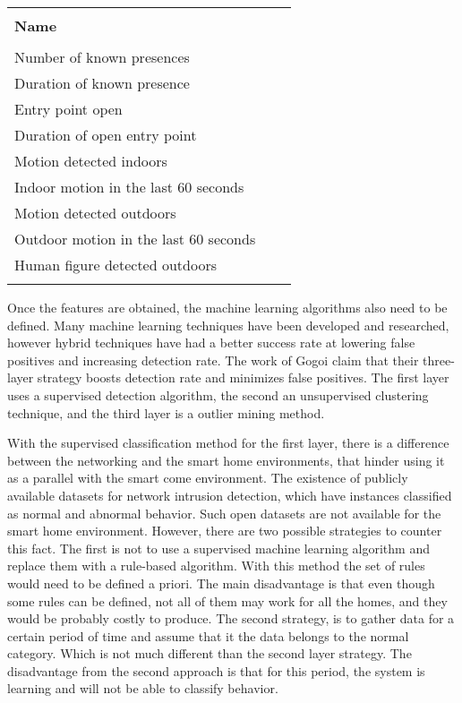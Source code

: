 {\centering
	{\footnotesize
		 \label{tab:features} 
		\begin{tabular}{llr}
			\hline
			&  \\
			\textbf{Name}   \\
			\hline
			&  \\
			Number of known presences \\ 
			Duration of known presence \\
			Entry point open \\
			Duration of open entry point  \\
			Motion detected indoors   \\
			Indoor motion in the last 60 seconds  \\
			Motion detected outdoors   \\
			Outdoor motion in the last 60 seconds  \\
			Human figure detected outdoors  \\
			\hline
			&  \\
		\end{tabular}
	}\par
}
Once the features are obtained, the machine learning algorithms also need to be defined. Many machine learning techniques have been developed and researched, however hybrid techniques have had a better success rate at lowering false positives and increasing detection rate. The work of Gogoi \etAl \cite{Gogoi01042014} claim that their three-layer strategy boosts detection rate and minimizes false positives. The first layer uses a supervised detection algorithm, the second an unsupervised clustering technique, and the third layer is a outlier mining method.

With the supervised classification method for the first layer, there is a difference between the networking and the smart home environments, that hinder using it as a parallel with the smart come environment. The existence of publicly available datasets for network intrusion detection, which have instances classified as normal and abnormal behavior. Such open datasets are not available for the smart home environment. However, there are two possible strategies to counter this fact. The first is not to use a supervised machine learning algorithm and replace them with a rule-based algorithm. With this method the set of rules would need to be defined a priori. The main disadvantage is that even though some rules can be defined, not all of them may work for all the homes, and they would be probably costly to produce. The second strategy, is to gather data for a certain period of time and assume that it the data belongs to the normal category. Which is not much different than the second layer strategy. The disadvantage from the second approach is that for this period, the system is learning and will not be able to classify behavior. 

